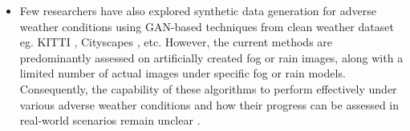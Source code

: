 \documentclass[rnd]{mas_proposal}
\begin{document}
\begin{itemize}
      \item Few researchers \cite{sun2021multi} \cite{zheng2020forkgan} \cite{lee2022perception} have also explored synthetic data generation for adverse weather conditions using GAN-based techniques from clean weather dataset eg. KITTI \cite{geiger2012we}, Cityscapes \cite{cordts2016cityscapes}, etc. However, the current methods are predominantly assessed on artificially created fog or rain images, along with a limited number of actual images under specific fog or rain models. Consequently, the capability of these algorithms to perform effectively under various adverse weather conditions and how their progress can be assessed in real-world scenarios remain unclear \cite{hassaballah2020vehicle}.
      

\end{itemize}
\end{document}
